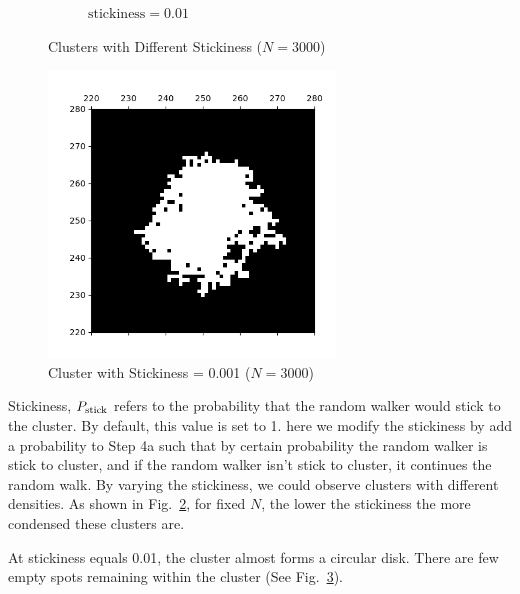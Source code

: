 \documentclass[aps,preprint,groupedaddress,letterpaper]{revtex4-1}
\begin{document}
\begin{figure}[h]
\begin{subfigure}[h]{0.23\textwidth}
         \caption{$\text{stickiness} = 0.01$}
         \label{st0.01}
     \end{subfigure}
        \caption{Clusters with Different Stickiness ($N = 3000$)}
        \label{sts}
\end{figure}

\begin{figure}[h]
\centering
\includegraphics[width=3.0in]{img/stickiness/zoomin.png}
\caption{Cluster with Stickiness = 0.001 ($N = 3000$)
\label{stzoom}}
\end{figure}

Stickiness, $P_{\rm stick}$ refers to the probability that the random walker would stick to the cluster. By default, this value is set to 1. here we modify the stickiness by add a probability to Step 4a such that by certain probability the random walker is stick to cluster, and if the random walker isn't stick to cluster, it continues the random walk. By varying the stickiness, we could observe clusters with different densities. As shown in Fig.~\ref{sts}, for fixed $N$, the lower the stickiness the more condensed these clusters are. 

At stickiness equals 0.01, the cluster almost forms a circular disk. There are few empty spots remaining within the cluster (See Fig.~\ref{stzoom}).
\end{document}
